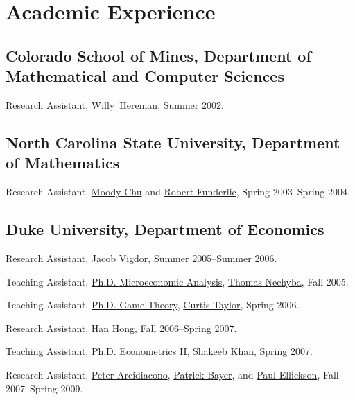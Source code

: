 \documentclass[letterpaper]{article}
\renewenvironment{itemize}{
  \begin{list}{}{
    \setlength{\leftmargin}{1em}
  }
}{
  \end{list}
}
\begin{document}
\section*{Academic Experience}

\subsection*{Colorado School of Mines,
  Department of Mathematical and Computer Sciences}

\begin{itemize}
\item Research Assistant,
  \href{http://www.mines.edu/fs_home/whereman/}{Willy\ Hereman},
  Summer 2002.
\end{itemize}

\subsection*{North Carolina State University,
  Department of Mathematics}

\begin{itemize}
\item Research Assistant,
  \href{http://www4.ncsu.edu/~mtchu/}{Moody Chu} and
  \href{http://www4.ncsu.edu/~ref/}{Robert Funderlic},
  Spring 2003--Spring 2004.
\end{itemize}

\subsection*{Duke University, Department of Economics}

\begin{itemize}
\item Research Assistant,
  \href{http://trinity.aas.duke.edu/~jvigdor/}{Jacob Vigdor},
  Summer 2005--Summer 2006.
\item Teaching Assistant,
  \href{http://jblevins.org/courses/econ301f05}{Ph.D. Microeconomic Analysis},
  \href{http://www.econ.duke.edu/~nechyba/}{Thomas Nechyba},
  Fall 2005.
\item Teaching Assistant,
  \href{http://jblevins.org/courses/econ302s06}{Ph.D. Game Theory},
  \href{http://www.duke.edu/~crtaylor/}{Curtis Taylor},
  Spring 2006.
\item Research Assistant,
  \href{http://www.stanford.edu/~doubleh/}{Han Hong},
  Fall 2006--Spring 2007.
\item Teaching Assistant,
  \href{http://jblevins.org/courses/econ342s07}{Ph.D. Econometrics II},
  \href{http://www.econ.duke.edu/~shakeebk/}{Shakeeb Khan},
  Spring 2007.
\item Research Assistant,
  \href{http://www.econ.duke.edu/~psarcidi/}{Peter Arcidiacono},
  \href{http://www.econ.duke.edu/~pb29/}{Patrick Bayer}, and
  \href{http://www.econ.duke.edu/~paule/}{Paul Ellickson},
  Fall 2007--Spring 2009.
\end{itemize}
\end{document}
